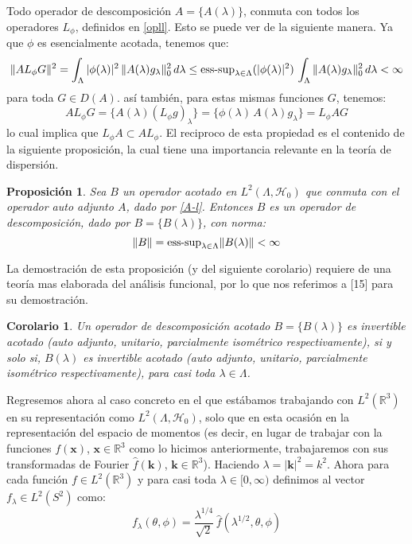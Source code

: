 \documentclass[12pt]{book}
\numberwithin{equation}{chapter}
\newtheorem{proposition}[theorem]{Proposici\'on}
\newtheorem{corollary}[theorem]{Corolario}
\def\R{\mathbb{R}}
\def\t{\theta}
\def\H{\mathcal{H}}
\def\x{\mathbf{x}}
\def\k{\mathbf{k}}
\begin{document}
Todo operador de descomposici\'on $A= \{ A(\lambda) \}$, conmuta con todos los operadores $L_{\phi}$, definidos en \eqref{opll}. Esto se puede ver de la siguiente manera. Ya que $\phi$ es esencialmente acotada, tenemos que:
$$ \| AL_{\phi}G \|^{2}= \int_{\Lambda} |\phi(\lambda)|^{2} \, \| A(\lambda)g_{\lambda} \|_{0}^{2} \, d\lambda \leq \hbox{ess-sup}_{\lambda \in \Lambda}(|\phi(\lambda)|^{2}) \, \int_{\Lambda} \| A(\lambda)g_{\lambda} \|_{0}^{2}\, d \lambda < \infty $$
para toda $G \in D(A)$. as\'i tambi\'en, para estas mismas funciones $G$, tenemos:
$$ AL_{\phi} G = \{ A(\lambda)(L_{\phi}g)_{\lambda} \}= \{ \phi(\lambda) \, A(\lambda) g_{\lambda} \}= L_{\phi} A G  $$
lo cual implica que $ L_{\phi}A \subset A L_{\phi} $. El reciproco de esta propiedad es el contenido de la siguiente proposici\'on, la cual tiene una importancia relevante en la teor\'ia de dispersi\'on.

\begin{proposition}\label{prop11}
Sea $B$ un operador acotado en $L^{2}(\Lambda , \H_{0})$ que conmuta con el operador auto adjunto $A$, dado por \eqref{A-l}. Entonces $B$ es un operador de descomposici\'on, dado por $B=\{ B(\lambda) \}$, con norma:
\begin{equation}
\| B \|= \hbox{ess-sup}_{\lambda \in \Lambda} \| B(\lambda) \| < \infty
\end{equation}
\end{proposition}

\vspace{5 mm}

La demostraci\'on de esta proposici\'on (y del siguiente corolario) requiere de una teor\'ia mas elaborada del an\'alisis funcional, por lo que nos referimos a [15] para su demostraci\'on.

\begin{corollary}\label{coll11}
Un operador de descomposici\'on acotado $B=\{ B(\lambda) \}$ es \emph{invertible acotado} (auto adjunto, unitario, parcialmente isom\'etrico respectivamente), si y solo si, $B(\lambda)$ es \emph{invertible acotado} (auto adjunto, unitario, parcialmente isom\'etrico respectivamente), para casi toda $\lambda \in \Lambda$.
\end{corollary}

\vspace{5 mm}

Regresemos ahora al caso concreto en el que est\'abamos trabajando con $L^{2}(\R^{3})$ en su representaci\'on como $L^{2}(\Lambda , \H_{0})$, solo que en esta ocasi\'on en la representaci\'on del espacio de momentos (es decir, en lugar de trabajar con la funciones $f(\x)$, $\x \in \R^{3}$ como lo hicimos anteriormente, trabajaremos con sus transformadas de Fourier $\hat{f}(\k)$, $\k \in \R^{3}$). Haciendo $\lambda = |\k|^{2}=k^{2}$. Ahora para cada funci\'on $f \in L^{2}(\R^{3})$ y para casi toda $\lambda \in [ 0 , \infty )$ definimos al vector $f_{\lambda} \in L^{2}(S^{2})$ como:
\begin{equation}\label{g0}
f_{\lambda}( \t , \phi )= \frac{\lambda^{1/4}}{\sqrt{2}}\, \hat{f} ( \lambda^{1/2},\t ,\phi ) 
\end{equation}
\end{document}

